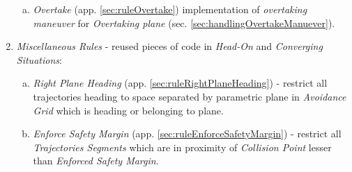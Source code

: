 \begin{enumerate}
\begin{enumerate}[a.]
        \item \emph{Overtake} (app. \ref{sec:ruleOvertake}) implementation of \emph{overtaking maneuver} for \emph{Overtaking plane} (sec. \ref{sec:handlingOvertakeManuever}).
    \end{enumerate}
    
    \item \emph{Miscellaneous Rules} - reused pieces of code in \emph{Head-On} and \emph{Converging Situations}:
    \begin{enumerate}[a.]
        \item \emph{Right Plane Heading} (app. \ref{sec:ruleRightPlaneHeading}) - restrict all trajectories heading to space separated by parametric plane in \emph{Avoidance Grid} which is heading or belonging to plane.
        
        \item \emph{Enforce Safety Margin} (app. \ref{sec:ruleEnforceSafetyMargin}) - restrict all \emph{Trajectories Segments} which are in proximity of \emph{Collision Point} lesser than \emph{Enforced Safety Margin}.
    \end{enumerate}
\end{enumerate}